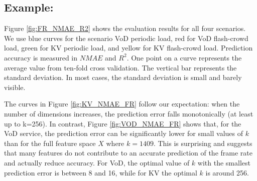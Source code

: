 \documentclass[10pt]{article} %
\begin{document}






\subsection*{Example:}

Figure \ref{fig:FR_NMAE_R2} shows the evaluation results for all four scenarios. We use blue curves for the scenario VoD periodic load, red for VoD flash-crowd load, green for KV periodic load, and yellow for KV flash-crowd load. Prediction accuracy is measured in $NMAE$ and $R^2$. One point on a curve represents the average value from ten-fold cross validation. The vertical bar represents the standard deviation. In most cases, the standard deviation is small and barely visible. 

The curves in Figure \ref{fig:KV_NMAE_FR} follow our expectation: when the number of dimensions increases, the prediction error falls monotonically (at least up to k=256). In contrast, Figure \ref{fig:VOD_NMAE_FR} shows that, for the VoD service, the prediction error can be significantly lower for small values of $k$ than for the full feature space $X$ where $k=1409$. This is surprising and suggests that many features do not contribute to an accurate prediction of the frame rate and actually reduce accuracy. For VoD, the optimal value of $k$ with the smallest prediction error is between 8 and 16, while for KV the optimal $k$ is around 256. 
\end{document}
